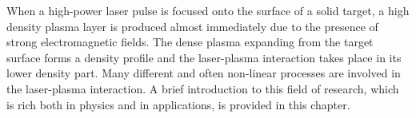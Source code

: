 When a high-power laser pulse is focused onto the surface of a solid target, a high density plasma layer is produced almost immediately due to the presence of strong electromagnetic fields. The dense plasma expanding from the target surface forms a density profile and the laser-plasma interaction takes place in its lower density part. Many different and often non-linear processes are involved in the laser-plasma interaction. A brief introduction to this field of research, which is rich both in physics and in applications, is provided in this chapter.